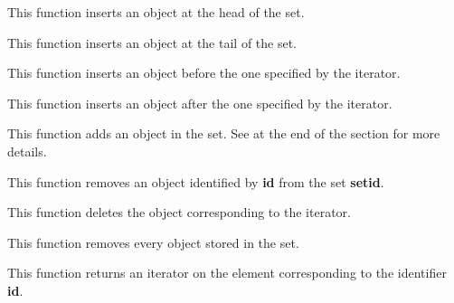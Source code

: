 This function inserts an object at the head of the set.


This function inserts an object at the tail of the set.


This function inserts an object before the one specified by the iterator.


This function inserts an object after the one specified by the iterator.


This function adds an object in the set. See at the end of the section
for more details.


This function removes an object identified by \textbf{id} from the
set \textbf{setid}.


This function deletes the object corresponding to the iterator.


This function removes every object stored in the set.


This function returns an iterator on the element corresponding to the
identifier \textbf{id}.

